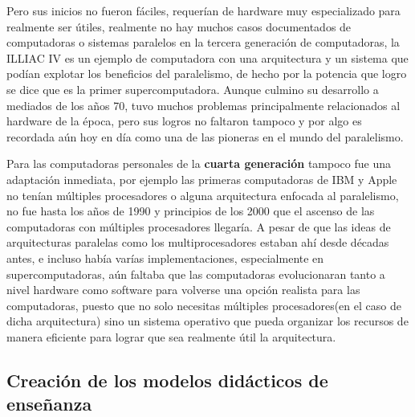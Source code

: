 \documentclass[letterpaper,12pt,oneside]{book}
\begin{document}
		Pero sus inicios no fueron fáciles, requerían de hardware muy especializado para realmente ser útiles, realmente no hay muchos casos documentados
		de computadoras o sistemas paralelos en la tercera generación de computadoras, la ILLIAC IV es un ejemplo de computadora con
		una arquitectura y un sistema que podían explotar los beneficios del paralelismo, de hecho por la potencia que logro se dice que es la primer supercomputadora. Aunque 
		culmino su desarrollo a mediados de los años 70, tuvo muchos problemas
		principalmente relacionados al hardware de la época, pero sus logros no faltaron tampoco y por algo es recordada aún hoy en día como una de las pioneras en el
		mundo del paralelismo\cite{hord_illiac_1982}.
		
		Para las computadoras personales de la \textbf{cuarta generación} tampoco fue una adaptación inmediata, por ejemplo las primeras computadoras de IBM y Apple no tenían
		múltiples procesadores o alguna arquitectura enfocada al paralelismo, no fue hasta los años de 1990 y principios de los 2000 que el ascenso de las computadoras con 	
		múltiples procesadores llegaría.
		A pesar de que las ideas de arquitecturas paralelas como los multiprocesadores estaban ahí desde décadas antes, e incluso había varías implementaciones,
		especialmente en supercomputadoras, aún faltaba que las computadoras evolucionaran tanto a nivel hardware como software para 
		volverse una opción realista para las computadoras, puesto que no solo necesitas múltiples procesadores(en el caso de dicha arquitectura) sino un sistema operativo 	
		que pueda organizar los recursos de manera eficiente para lograr que sea realmente útil la arquitectura\cite{computer_history_museum_computers_nodate}.
		
		
		\clearpage		
		
		\subsection{Creación de los modelos didácticos de enseñanza}
		
\end{document}

